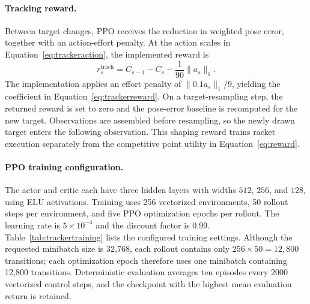 \documentclass[pmlr]{jmlr}
\begin{document}
\paragraph{Tracking reward.}
Between target changes, PPO receives the reduction in weighted pose error, together with an action-effort penalty. At the action scales in Equation~\eqref{eq:trackeraction}, the implemented reward is
\begin{equation}
 r_s^{\mathrm{track}}=C_{s-1}-C_s-\frac{1}{90}\|a_s\|_1.
 \label{eq:trackerreward}
\end{equation}
The implementation applies an effort penalty of $\|0.1a_s\|_1/9$, yielding the coefficient in Equation~\eqref{eq:trackerreward}. On a target-resampling step, the returned reward is set to zero and the pose-error baseline is recomputed for the new target. Observations are assembled before resampling, so the newly drawn target enters the following observation. This shaping reward trains racket execution separately from the competitive point utility in Equation~\eqref{eq:reward}.

\paragraph{PPO training configuration.}
The actor and critic each have three hidden layers with widths $512$, $256$, and $128$, using ELU activations. Training uses 256 vectorized environments, 50 rollout steps per environment, and five PPO optimization epochs per rollout. The learning rate is $5\times10^{-4}$ and the discount factor is 0.99. Table~\ref{tab:trackertraining} lists the configured training settings. Although the requested minibatch size is 32,768, each rollout contains only $256\times50=12,800$ transitions; each optimization epoch therefore uses one minibatch containing 12,800 transitions. Deterministic evaluation averages ten episodes every 2000 vectorized control steps, and the checkpoint with the highest mean evaluation return is retained.
\end{document}
